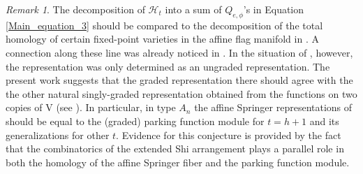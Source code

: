 \documentclass[10pt]{amsart}
\renewcommand{\H}{{\mathcal{H}_t}}
\theoremstyle{plain}
\theoremstyle{definition}
\theoremstyle{remark}
\newtheorem{remark}[theorem]{Remark}
\begin{document}
\begin{remark}
The decomposition of $\H$ into a sum of $Q_{e,\phi}$'s in Equation \ref{Main_equation_3}
should be compared to the decomposition of the total homology of certain fixed-point varieties in the affine flag manifold 
in \cite{sommers:affineweylgp}.  A connection along these line was already noticed in \cite{beg}.
In the situation of \cite{sommers:affineweylgp}, however, the representation was only determined as an ungraded representation.  
The present work suggests that the graded representation there should agree with the the other 
natural singly-graded representation obtained from the functions on two copies of V (see \cite{haiman:cdm}).  In particular, in type $A_n$ the affine Springer representations of \cite{sommers:affineweylgp} should be equal to the (graded) parking function module for $t=h+1$ and its generalizations for other $t$.
Evidence for this conjecture is provided by the fact that the combinatorics of the extended Shi arrangement plays a parallel role in both the homology of the affine Springer fiber and the parking function module.
\end{remark}




\end{document}
